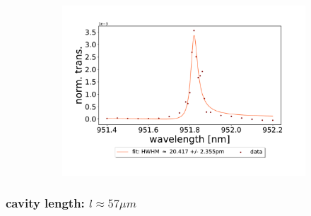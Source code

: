 \begin{figure}[h!]
\begin{subfigure}[b]{0.49\textwidth}
        \includegraphics[width=\textwidth]{figures/results/single fano fits/120um_M5_fit_3.pdf}
        \caption{}
        \label{fig:120um_M5_fit_3}
    \end{subfigure}
\end{figure}

\clearpage
\subsubsection*{cavity length: $l \approx 57 \mu m$}

